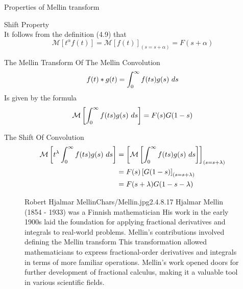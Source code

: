 Properties of Mellin transform 
\setcounter{property}{0}
\begin{property}
    Shift Property 
    \\
    It follows from the definition (4.9) that
    \begin{equation}
        \mathcal{M}\left[ t^\alpha f(t) \right] =\mathcal{M}\left[ f(t) \right]_{(s=s+\alpha)}= F(s+\alpha)
    \end{equation}
\end{property}
\begin{property}
The Mellin Transform Of The Mellin Convolution
\[
f(t)*g(t) = \int_{0}^{\infty} f(ts)g(s) \,\, ds
\]
Is given by the formula
\begin{equation}
    \mathcal{M}\left[ \int_{0}^{\infty} f(ts)g(s) \,\, ds \right] = F(s)G(1-s)
\end{equation}
\end{property}
\begin{property}
The Shift Of Convolution
\begin{align*}
    \mathcal{M}\left[ t^\lambda \int_{0}^{\infty} f(ts)g(s) \,\, ds \right] &= \left[ \mathcal{M}\left[\int_{0}^{\infty} f(ts)g(s) \,\, ds \right]\right]_{(s=s+\lambda)}
    \\
    &= F(s)\left[ G(1-s) \right]_{(s=s+\lambda)}
    \\
    &= F(s+\lambda)G(1-s-\lambda)
\end{align*}
\end{property}

\begin{figure*}[b]
    \begin{minipage}[h]{\textwidth}
        \begin{enrichment}{Robert Hjalmar Mellin}{Chars/Mellin.jpg}{2.4}{.8}{.17}
            Hjalmar Mellin (1854 - 1933) was a Finnish mathematician
            His work in the early 1900s laid the foundation for applying fractional derivatives and integrals to real-world problems. 
            Mellin's contributions involved defining the Mellin transform This transformation allowed mathematicians to express 
            fractional-order derivatives and integrals in terms of more familiar operations. 
            Mellin's work opened doors for further development of fractional calculus, 
            making it a valuable tool in various scientific fields.
        \end{enrichment} 
    \end{minipage}
\end{figure*}

